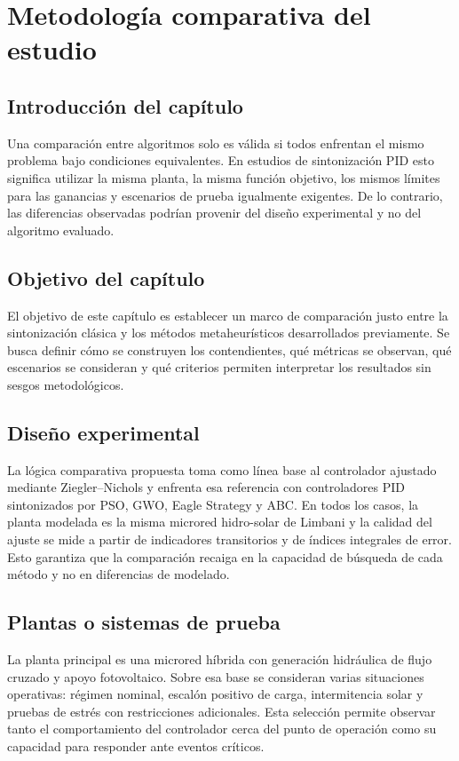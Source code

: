 \chapter{Metodología comparativa del estudio}
\label{ch:metodologia-comparativa}

\section{Introducción del capítulo}
Una comparación entre algoritmos solo es válida si todos enfrentan el mismo problema bajo
condiciones equivalentes. En estudios de sintonización PID esto significa utilizar la misma
planta, la misma función objetivo, los mismos límites para las ganancias y escenarios de prueba
igualmente exigentes. De lo contrario, las diferencias observadas podrían provenir del diseño
experimental y no del algoritmo evaluado.

\section{Objetivo del capítulo}
El objetivo de este capítulo es establecer un marco de comparación justo entre la sintonización
clásica y los métodos metaheurísticos desarrollados previamente. Se busca definir cómo se
construyen los contendientes, qué métricas se observan, qué escenarios se consideran y qué
criterios permiten interpretar los resultados sin sesgos metodológicos.

\section{Diseño experimental}
La lógica comparativa propuesta toma como línea base al controlador ajustado mediante
Ziegler--Nichols y enfrenta esa referencia con controladores PID sintonizados por PSO, GWO,
Eagle Strategy y ABC. En todos los casos, la planta modelada es la misma microred
hidro-solar de Limbani y la calidad del ajuste se mide a partir de indicadores transitorios y de
índices integrales de error. Esto garantiza que la comparación recaiga en la capacidad de
búsqueda de cada método y no en diferencias de modelado.

\section{Plantas o sistemas de prueba}
La planta principal es una microred híbrida con generación hidráulica de flujo cruzado y apoyo
fotovoltaico. Sobre esa base se consideran varias situaciones operativas: régimen nominal,
escalón positivo de carga, intermitencia solar y pruebas de estrés con restricciones adicionales.
Esta selección permite observar tanto el comportamiento del controlador cerca del punto de
operación como su capacidad para responder ante eventos críticos.

